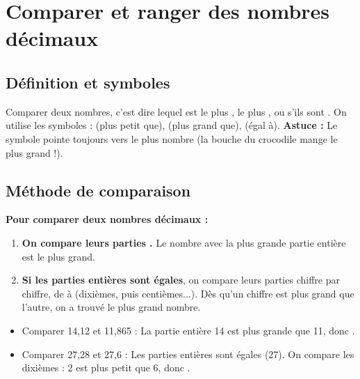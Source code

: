 \section{Comparer et ranger des nombres décimaux}

\subsection{Définition et symboles}
Comparer deux nombres, c'est dire lequel est le plus , le plus , ou s'ils sont .
On utilise les symboles : \solution{$<$} (plus petit que), \solution{$>$} (plus grand que), \solution{$=$} (égal à).
\textbf{Astuce :} Le symbole pointe toujours vers le plus  nombre (la bouche du crocodile mange le plus grand !).

\subsection{Méthode de comparaison}

\begin{methodebox}
	\textbf{Pour comparer deux nombres décimaux :}
	\begin{enumerate}
		\item \textbf{On compare leurs parties .} Le nombre avec la plus grande partie entière est le plus grand.
		\item \textbf{Si les parties entières sont égales}, on compare leurs parties  chiffre par chiffre, de  à  (dixièmes, puis centièmes...). Dès qu'un chiffre est plus grand que l'autre, on a trouvé le plus grand nombre.
	\end{enumerate}
\end{methodebox}

\begin{examplebox}
	\begin{itemize}
		\item Comparer 14,12 et 11,865 : La partie entière 14 est plus grande que 11, donc .\\
		\item Comparer 27,28 et 27,6 : Les parties entières sont égales (27). On compare les dixièmes : 2 est plus petit que 6, donc .
	\end{itemize}
\end{examplebox}

\clearpage
